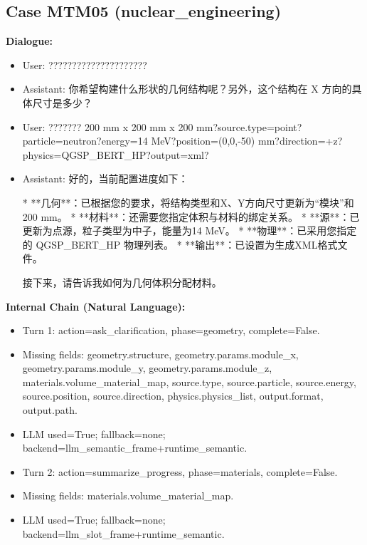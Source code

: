 \documentclass[11pt]{ctexart}
\begin{document}
\subsection{Case MTM05 (nuclear\_engineering)}
\textbf{Dialogue:}
\begin{itemize}
\item User: ?????????????????????
\item Assistant: 你希望构建什么形状的几何结构呢？另外，这个结构在 X 方向的具体尺寸是多少？
\item User: ??????? 200 mm x 200 mm x 200 mm?source.type=point?particle=neutron?energy=14 MeV?position=(0,0,-50) mm?direction=+z?physics=QGSP\_BERT\_HP?output=xml?
\item Assistant: 好的，当前配置进度如下：

*   **几何**：已根据您的要求，将结构类型和X、Y方向尺寸更新为“模块”和200 mm。
*   **材料**：还需要您指定体积与材料的绑定关系。
*   **源**：已更新为点源，粒子类型为中子，能量为14 MeV。
*   **物理**：已采用您指定的 QGSP\_BERT\_HP 物理列表。
*   **输出**：已设置为生成XML格式文件。

接下来，请告诉我如何为几何体积分配材料。
\end{itemize}
\textbf{Internal Chain (Natural Language):}
\begin{itemize}
\item Turn 1: action=ask\_clarification, phase=geometry, complete=False.
\item Missing fields: geometry.structure, geometry.params.module\_x, geometry.params.module\_y, geometry.params.module\_z, materials.volume\_material\_map, source.type, source.particle, source.energy, source.position, source.direction, physics.physics\_list, output.format, output.path.
\item LLM used=True; fallback=none; backend=llm\_semantic\_frame+runtime\_semantic.
\item Turn 2: action=summarize\_progress, phase=materials, complete=False.
\item Missing fields: materials.volume\_material\_map.
\item LLM used=True; fallback=none; backend=llm\_slot\_frame+runtime\_semantic.
\end{itemize}
\end{document}

